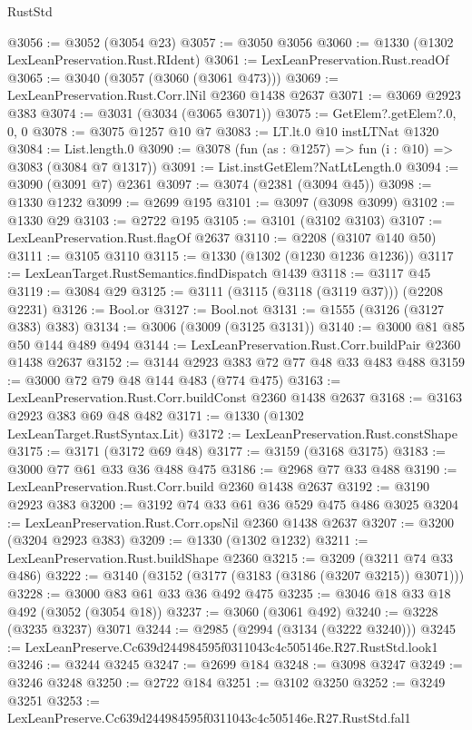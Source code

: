 \begin{lexlean}{RustStd}
\begin{coremodule}
@3056 := @3052 (@3054 @23)
@3057 := @3050 @3056
@3060 := @1330 (@1302 LexLeanPreservation.Rust.RIdent)
@3061 := LexLeanPreservation.Rust.readOf
@3065 := @3040 (@3057 (@3060 (@3061 @473)))
@3069 := LexLeanPreservation.Rust.Corr.lNil @2360 @1438 @2637
@3071 := @3069 @2923 @383
@3074 := @3031 (@3034 (@3065 @3071))
@3075 := GetElem?.getElem?.{0, 0, 0}
@3078 := @3075 @1257 @10 @7
@3083 := LT.lt.{0} @10 instLTNat @1320
@3084 := List.length.{0}
@3090 := @3078 (fun (as : @1257) => fun (i : @10) => @3083 (@3084 @7 @1317))
@3091 := List.instGetElem?NatLtLength.{0}
@3094 := @3090 (@3091 @7) @2361
@3097 := @3074 (@2381 (@3094 @45))
@3098 := @1330 @1232
@3099 := @2699 @195
@3101 := @3097 (@3098 @3099)
@3102 := @1330 @29
@3103 := @2722 @195
@3105 := @3101 (@3102 @3103)
@3107 := LexLeanPreservation.Rust.flagOf @2637
@3110 := @2208 (@3107 @140 @50)
@3111 := @3105 @3110
@3115 := @1330 (@1302 (@1230 @1236 @1236))
@3117 := LexLeanTarget.RustSemantics.findDispatch @1439
@3118 := @3117 @45
@3119 := @3084 @29
@3125 := @3111 (@3115 (@3118 (@3119 @37))) (@2208 @2231)
@3126 := Bool.or
@3127 := Bool.not
@3131 := @1555 (@3126 (@3127 @383) @383)
@3134 := @3006 (@3009 (@3125 @3131))
@3140 := @3000 @81 @85 @50 @144 @489 @494
@3144 := LexLeanPreservation.Rust.Corr.buildPair @2360 @1438 @2637
@3152 := @3144 @2923 @383 @72 @77 @48 @33 @483 @488
@3159 := @3000 @72 @79 @48 @144 @483 (@774 @475)
@3163 := LexLeanPreservation.Rust.Corr.buildConst @2360 @1438 @2637
@3168 := @3163 @2923 @383 @69 @48 @482
@3171 := @1330 (@1302 LexLeanTarget.RustSyntax.Lit)
@3172 := LexLeanPreservation.Rust.constShape
@3175 := @3171 (@3172 @69 @48)
@3177 := @3159 (@3168 @3175)
@3183 := @3000 @77 @61 @33 @36 @488 @475
@3186 := @2968 @77 @33 @488
@3190 := LexLeanPreservation.Rust.Corr.build @2360 @1438 @2637
@3192 := @3190 @2923 @383
@3200 := @3192 @74 @33 @61 @36 @529 @475 @486 @3025
@3204 := LexLeanPreservation.Rust.Corr.opsNil @2360 @1438 @2637
@3207 := @3200 (@3204 @2923 @383)
@3209 := @1330 (@1302 @1232)
@3211 := LexLeanPreservation.Rust.buildShape @2360
@3215 := @3209 (@3211 @74 @33 @486)
@3222 := @3140 (@3152 (@3177 (@3183 (@3186 (@3207 @3215)) @3071)))
@3228 := @3000 @83 @61 @33 @36 @492 @475
@3235 := @3046 @18 @33 @18 @492 (@3052 (@3054 @18))
@3237 := @3060 (@3061 @492)
@3240 := @3228 (@3235 @3237) @3071
@3244 := @2985 (@2994 (@3134 (@3222 @3240)))
@3245 := LexLeanPreserve.Cc639d244984595f0311043c4c505146e.R27.RustStd.look1
@3246 := @3244 @3245
@3247 := @2699 @184
@3248 := @3098 @3247
@3249 := @3246 @3248
@3250 := @2722 @184
@3251 := @3102 @3250
@3252 := @3249 @3251
@3253 := LexLeanPreserve.Cc639d244984595f0311043c4c505146e.R27.RustStd.fal1

\end{coremodule}
\end{lexlean}
